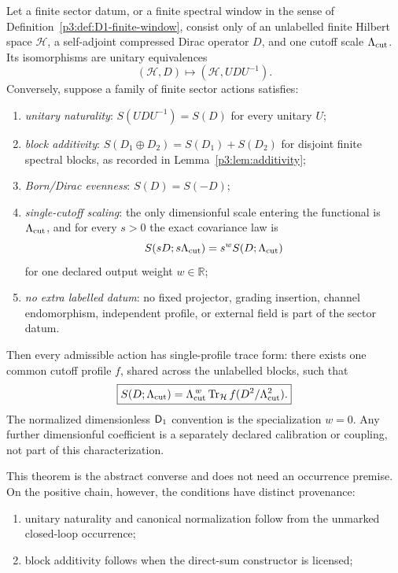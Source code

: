 \documentclass[12pt,a4paper]{article}
\begin{document}
\begin{theorem}
\label{p3:thm:spectral-characterization}
Let a finite sector datum, or a finite spectral window in the sense of Definition~\ref{p3:def:D1-finite-window}, consist only of an unlabelled finite Hilbert space
\(\mathcal H\), a self-adjoint compressed Dirac operator \(D\), and one cutoff scale \(\Lambda_{\mathrm{cut}}\).  Its
isomorphisms are unitary equivalences
\[
        (\mathcal H,D)\longmapsto(\mathcal H,UDU^{-1}).
\]
Conversely, suppose a family of finite sector actions satisfies:
\begin{enumerate}[label=(\roman*),leftmargin=2.1em]
\item \emph{unitary naturality}: \(S(UDU^{-1})=S(D)\) for every unitary \(U\);
\item \emph{block additivity}: \(S(D_1\oplus D_2)=S(D_1)+S(D_2)\) for disjoint finite
spectral blocks, as recorded in
Lemma~\ref{p3:lem:additivity};
\item \emph{Born/Dirac evenness}: \(S(D)=S(-D)\);
\item \emph{single-cutoff scaling}: the only dimensionful scale entering the
functional is \(\Lambda_{\mathrm{cut}}\), and for every \(s>0\) the exact covariance law is
\[
 S(sD;s\Lambda_{\mathrm{cut}})=s^wS(D;\Lambda_{\mathrm{cut}})
\]
for one declared output weight \(w\in\mathbb R\);
\item \emph{no extra labelled datum}: no fixed projector, grading insertion, channel
endomorphism, independent profile, or external field is part of the sector datum.
\end{enumerate}
Then every admissible action has single-profile trace form: there exists one
common cutoff profile \(f\), shared across the unlabelled blocks, such that
\[
        \boxed{
        S(D;\Lambda_{\mathrm{cut}})=\Lambda_{\mathrm{cut}}^{\,w}
        \operatorname{Tr}_{\mathcal H} f(D^2/\Lambda_{\mathrm{cut}}^2).}
\]
The normalized dimensionless \(\mathsf{D}_1\) convention is the specialization
\(w=0\).  Any further dimensionful coefficient is a separately declared
calibration or coupling, not part of this characterization.
\begin{remark}
\label{p3:rem:dcl-conditions-derived}
This theorem is the abstract converse and does not need an occurrence premise.
On the positive chain, however, the conditions have distinct provenance:
\begin{enumerate}[label=(\roman*),leftmargin=2.1em]
\item unitary naturality and canonical normalization follow from the unmarked
closed-loop occurrence;
\item block additivity follows when the direct-sum constructor is licensed;

\end{enumerate}
\end{remark}
\end{theorem}
\end{document}

